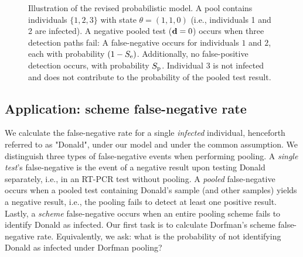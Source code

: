 \documentclass{article}
\begin{document}
\begin{figure}[H]
  \centering
  \caption{Illustration of the revised probabilistic model. A pool contains individuals
    $\{1,2,3\}$ with state $\theta=(1,1,0)$ (i.e., individuals 1 and 2
    are infected). A negative pooled test ($\mathbf{d}=0$) occurs when
    three detection paths fail: A false-negative occurs for
    individuals $1$ and $2$, each with probability $(1-S_{\text{e}})$.
    Additionally, no false-positive detection occurs, with probability
    $S_{\text{p}}$. Individual $3$ is not infected and does not contribute to
    the probability of the pooled test result.}\label{fig:likelihood}
\end{figure}


\subsection*{Application: scheme false-negative rate}
We calculate the false-negative rate for a single \emph{infected}
individual, henceforth referred to as "Donald", under our model and
under the common assumption. We distinguish three types of
false-negative events when performing pooling. A \emph{single test}'s
false-negative is the event of a negative result upon testing Donald
separately, i.e., in an RT-PCR test without pooling. A \emph{pooled}
false-negative occurs when a pooled test containing Donald's sample
(and other samples) yields a negative result, i.e., the pooling fails
to detect at least one positive result. Lastly, a \emph{scheme}
false-negative occurs when an entire pooling scheme fails to identify
Donald as infected. Our first task is to calculate Dorfman's scheme
false-negative rate. Equivalently, we ask: what is the probability of
not identifying Donald as infected under Dorfman pooling?
\end{document}

